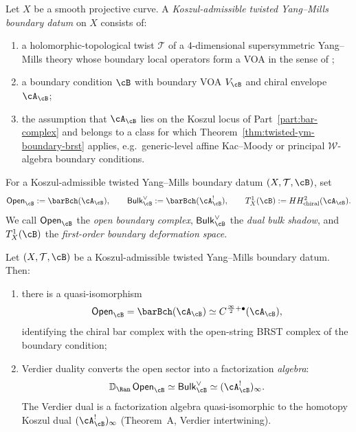 \begin{definition}
\label{def:twisted-ym-boundary-datum}
Let $X$ be a smooth projective curve. A \emph{Koszul-admissible twisted Yang--Mills boundary datum}
on $X$ consists of:
\begin{enumerate}[label=(\roman*)]
\item a holomorphic-topological twist $\mathcal{T}$ of a $4$-dimensional supersymmetric
Yang--Mills theory whose boundary local operators form a VOA in the sense of
{\cite{PW22}};
\item a boundary condition $\cB$ with boundary VOA $V_{\cB}$ and chiral envelope $\cA_{\cB}$;
\item the assumption that $\cA_{\cB}$ lies on the Koszul locus of Part~\ref{part:bar-complex} and belongs to a class
for which Theorem~\ref{thm:twisted-ym-boundary-brst} applies, e.g.\ generic-level affine
Kac--Moody or principal $\mathcal{W}$-algebra boundary conditions.
\end{enumerate}
\end{definition}

\begin{notation}
\label{not:twisted-ym-boundary-objects}
For a Koszul-admissible twisted Yang--Mills boundary datum $(X,\mathcal{T},\cB)$, set
\[
\mathsf{Open}_{\cB} := \barBch(\cA_{\cB}),
\qquad
\mathsf{Bulk}^{\vee}_{\cB} := \barBch(\cA_{\cB}^!),
\qquad
T^1_X(\cB) := HH^2_{\mathrm{chiral}}(\cA_{\cB}).
\]
We call $\mathsf{Open}_{\cB}$ the \emph{open boundary complex}, $\mathsf{Bulk}^{\vee}_{\cB}$ the
\emph{dual bulk shadow}, and $T^1_X(\cB)$ the \emph{first-order boundary deformation space}.
\end{notation}

\begin{theorem}
\label{thm:twisted-ym-boundary-brst}
Let $(X,\mathcal{T},\cB)$ be a Koszul-admissible twisted Yang--Mills boundary datum.
Then:
\begin{enumerate}[label=(\alph*)]
\item there is a quasi-isomorphism
\[
\mathsf{Open}_{\cB} = \barBch(\cA_{\cB}) \simeq C^{\frac{\infty}{2}+\bullet}(\cA_{\cB}),
\]
identifying the chiral bar complex with the open-string BRST complex of the boundary condition;
\item Verdier duality converts the open sector into a factorization \emph{algebra}:
\[
\mathbb{D}_{\Ran}\, \mathsf{Open}_{\cB} \simeq \mathsf{Bulk}^{\vee}_{\cB} \simeq (\cA_{\cB}^!)_\infty.
\]
The Verdier dual is a factorization algebra quasi-isomorphic to the homotopy Koszul dual $(\cA_{\cB}^!)_\infty$ (Theorem~A, Verdier intertwining).
\end{enumerate}
\end{theorem}

